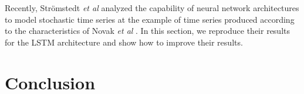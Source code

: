 \documentclass{article}
\begin{document}
Recently, Strömstedt \textit{et al} analyzed the capability of neural network
architectures to model stochastic time series \cite{stroemstedt2018} at the 
example of time series produced according to the characteristics of Novak 
\textit{et al} \cite{novak2008}. In this section, we reproduce their results for
the LSTM architecture and show how to improve their results.

\section{Conclusion}



\end{document}
